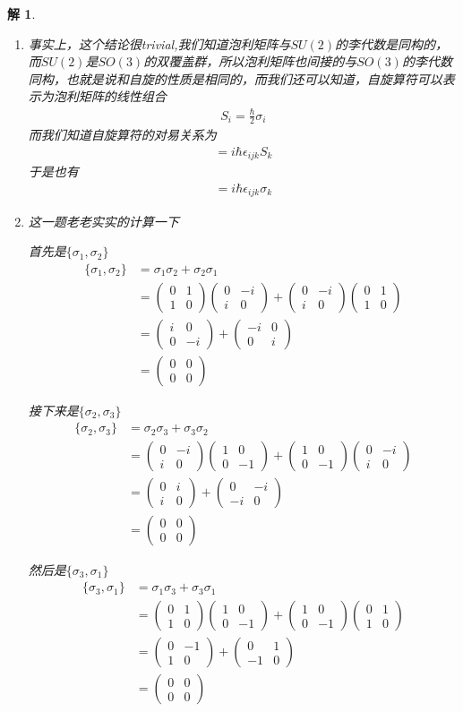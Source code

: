 \documentclass{article}
\newtheorem{solution}{解}
\newcommand{\pmtwo}[4]{
    \begin{pmatrix}
        #1&#2\\
        #3&#4
    \end{pmatrix}
    }
\begin{document}
\begin{solution}
    \ \\
    \begin{enumerate}
        \item[(1)] 事实上，这个结论很trivial,我们知道泡利矩阵与$SU(2)$的李代数是同构的，而$SU(2)$是$SO(3)$的双覆盖群，所以泡利矩阵也间接的与$SO(3)$的李代数同构，也就是说和自旋的性质是相同的，而我们还可以知道，自旋算符可以表示为泡利矩阵的线性组合
        \begin{align*}
            S_i=\frac{\hbar}{2}\sigma_i
        \end{align*}
        而我们知道自旋算符的对易关系为
        \begin{align*}
            [S_i,S_j]=i\hbar\epsilon_{ijk}S_k
        \end{align*}
        于是也有
        \begin{align*}
            [\sigma_i,\sigma_j]=i\hbar\epsilon_{ijk}\sigma_k
        \end{align*}
        \item[(2)] 这一题老老实实的计算一下
        
        首先是$\{\sigma_1,\sigma_2\}$
        \begin{align*}
            \{\sigma_1,\sigma_2\}&=\sigma_1\sigma_2+\sigma_2\sigma_1\\
            &=\pmtwo{0}{1}{1}{0}\pmtwo{0}{-i}{i}{0}+\pmtwo{0}{-i}{i}{0}\pmtwo{0}{1}{1}{0}\\
            &=\pmtwo{i}{0}{0}{-i}+\pmtwo{-i}{0}{0}{i}\\
            &=\pmtwo{0}{0}{0}{0}
        \end{align*}

        接下来是$\{\sigma_2,\sigma_3\}$
        \begin{align*}
            \{\sigma_2,\sigma_3\}&=\sigma_2\sigma_3+\sigma_3\sigma_2\\
            &=\pmtwo{0}{-i}{i}{0}\pmtwo{1}{0}{0}{-1}+\pmtwo{1}{0}{0}{-1}\pmtwo{0}{-i}{i}{0}\\
            &=\pmtwo{0}{i}{i}{0}+\pmtwo{0}{-i}{-i}{0}\\
            &=\pmtwo{0}{0}{0}{0}
        \end{align*}

        然后是$\{\sigma_3,\sigma_1\}$
        \begin{align*}
            \{\sigma_3,\sigma_1\}&=\sigma_1\sigma_3+\sigma_3\sigma_1\\
            &=\pmtwo{0}{1}{1}{0}\pmtwo{1}{0}{0}{-1}+\pmtwo{1}{0}{0}{-1}\pmtwo{0}{1}{1}{0}\\
            &=\pmtwo{0}{-1}{1}{0}+\pmtwo{0}{1}{-1}{0}\\
            &=\pmtwo{0}{0}{0}{0}
        \end{align*}
        

\end{enumerate}
\end{solution}
\end{document}
